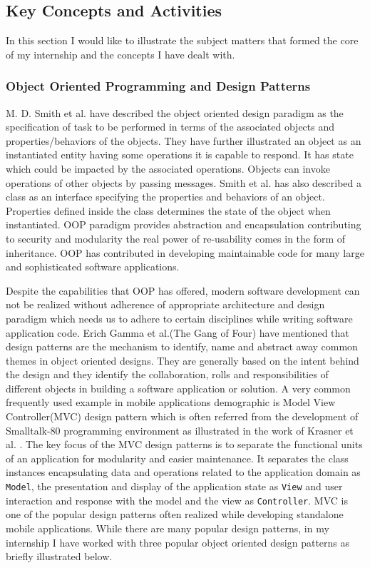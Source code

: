 \subsection{Key Concepts and Activities}
In this section I would like to illustrate the subject  matters that formed the core of my internship and the concepts I have dealt with.

\subsubsection{Object Oriented Programming and Design Patterns}
M. D. Smith et al. \cite{smith2011object} have described the object oriented design paradigm as the specification of task to be performed in terms of the associated objects and properties/behaviors of the objects. They have further illustrated an object as an instantiated entity having some operations it is capable to respond. It has state which could be impacted by the associated operations. Objects can invoke operations of other objects by passing messages. Smith et al. \cite{smith2011object} has also described a class as an interface specifying the properties and behaviors of an object. Properties defined inside the class determines the state of the object when instantiated. OOP paradigm provides abstraction and encapsulation contributing to security and modularity the real power of re-usability comes in the form of inheritance. OOP has contributed in developing maintainable code for many large and sophisticated software applications. 
\par Despite the capabilities that OOP has offered, modern software development can not be realized without adherence of appropriate architecture and design paradigm which needs us to adhere to certain disciplines while writing software application code. Erich Gamma et al.(The Gang of Four) \cite{gamma1995design}  have mentioned that design patterns are the mechanism to identify, name and abstract away common themes in object oriented designs. They are generally based on the intent behind the design and they identify the collaboration, rolls and responsibilities of different objects in building a software application or solution. A very common frequently used example in mobile applications demographic is Model View Controller(MVC) design pattern which is often referred from the development of  Smalltalk-80 programming environment as illustrated in the work of Krasner et al. \cite{krasner1988description}. The key focus of the MVC design patterns is to separate the functional units of an application for modularity and easier maintenance. It separates the class instances encapsulating data and operations related to the application domain as \texttt{Model}, the presentation and display of the application state as \texttt{View} and user interaction and response with the model and the view as \texttt{Controller}. MVC is one of the popular design patterns often realized while developing standalone mobile applications. While there are many popular design patterns, in my internship I have worked with three popular object oriented design patterns as briefly illustrated below.
